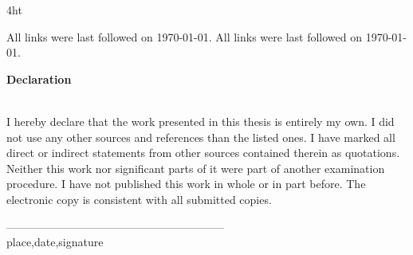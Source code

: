 \documentclass[
               fontsize=12pt, %
               paper=a4,
               twoside, %
               BCOR=3mm, %
               DIV=13,   %
               headinclude=true,
               footinclude=false,
               bibliography=totoc,
               headsepline,
               cleardoublepage=empty,
               parskip=half,
               pointlessnumbers, %
               final   %
               ]{scrbook}
\let\ifdeutsch\iffalse
\begin{document}

\endgroup

\cleardoublepage

\iftex4ht
\else
\fi



\renewcommand*{\chapterpagestyle}{scrplain}
\pagestyle{scrheadings}

%
%
%
\cleardoublepage

\cleardoublepage

\cleardoublepage

\cleardoublepage

\cleardoublepage

\cleardoublepage

\cleardoublepage

%
%
\appendix
%


\printbibliography

\ifdeutsch
All links were last followed on \today.
\else
All links were last followed on \today.
\fi

\pagestyle{empty}
\renewcommand*{\chapterpagestyle}{empty}
\pagestyle{empty}
\vspace{9cm}
\begin{center}
	\begin{minipage}{11cm}
		\vspace{6cm}
		
		\textbf{\Large Declaration}\\\\
		\vspace{0.4cm}
		
		I hereby declare that the work presented in this thesis is entirely my own. 
		I did not use any other sources and references than the listed ones. I have marked all direct or indirect statements from other sources contained therein as quotations. 
		Neither this work nor significant parts of it were part of another examination procedure. I have not published this work in whole or in part before. 
		The electronic copy is consistent with all submitted copies.
		\vspace{1cm}
		
		
		
		
\hspace{2.1cm}-----------------------------------------------------------\\
\vspace{1cm} \hspace{2.1cm} place,date,signature
	\end{minipage}
\end{center}
\end{document}
